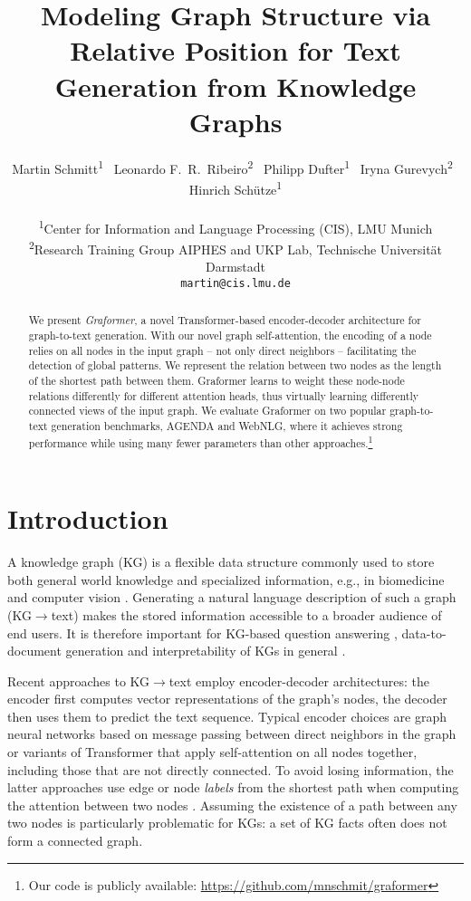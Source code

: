 \documentclass[11pt]{article}
\title{Modeling Graph Structure via Relative Position for Text Generation from Knowledge Graphs}
\author{Martin Schmitt\textsuperscript{1}
	\, Leonardo F.\ R.\ Ribeiro\textsuperscript{2}
	\, Philipp Dufter\textsuperscript{1}
	\, Iryna Gurevych\textsuperscript{2}
	\, Hinrich Sch\"{u}tze\textsuperscript{1}\\\\
\textsuperscript{1}Center for Information and Language Processing (CIS), LMU Munich\\
	\textsuperscript{2}Research Training Group AIPHES and UKP Lab, Technische Universität Darmstadt\\
	{\tt martin@cis.lmu.de}
}
\date{}
\newcommand{\gtt}{KG$\to$text}
\begin{document}
\maketitle
\begin{abstract}
We present \emph{Graformer}, a novel Transformer-based encoder-decoder architecture for graph-to-text generation.
With our novel graph self-attention,
the encoding of a node relies on all nodes in the input graph
-- not only direct neighbors --
facilitating the detection of global patterns.
We represent
the relation between two nodes as
the length of the shortest path between them.
Graformer learns to weight these node-node relations
differently for different attention heads,
thus virtually learning differently connected views of the input graph.
We evaluate Graformer on two popular graph-to-text generation benchmarks,
AGENDA and WebNLG,
where it achieves strong performance
while using many fewer parameters
than other approaches.\footnote{Our code is publicly available: \url{https://github.com/mnschmit/graformer}}
\end{abstract}

\section{Introduction}
A knowledge graph (KG) is a flexible data structure
commonly used to store both general world knowledge \citep{auer08}
and specialized information, e.g., in biomedicine
\citep{wishart18}
and computer vision
\citep{visualgenome}.
Generating a natural language description of such a graph (\gtt{})
makes the stored information accessible to a broader audience of end users.
It is therefore important for KG-based question answering \citep{bhowmik-de-melo-2018-generating},
data-to-document generation \citep{moryossef-etal-2019-step,koncel-kedziorski-etal-2019-text}
and interpretability of KGs in general \citep{schmitt20}.

Recent approaches to \gtt{} employ encoder-decoder architectures:
the encoder first computes vector representations of the
graph's nodes, the decoder 
then uses them to predict the text sequence.
Typical encoder choices are graph neural networks
based on message passing between direct neighbors in the graph \citep{kipf17,velickovic18}
or variants of Transformer \citep{vaswani17}
that apply self-attention on all nodes together,
including those that
are not directly connected.
To avoid losing information,
the latter approaches use edge or node \textit{labels} from the
shortest path
when computing the attention between two nodes \citep{zhu-etal-2019-modeling,cai20}.
Assuming the existence of a path between any two nodes is
particularly problematic for KGs:
a set of KG facts often does not form a connected graph.
\end{document}
